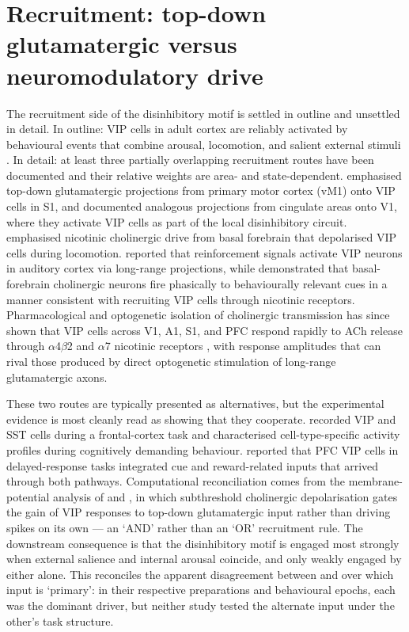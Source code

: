 \documentclass[11pt]{article}
\begin{document}
\section{Recruitment: top-down glutamatergic versus neuromodulatory drive}

The recruitment side of the disinhibitory motif is settled in outline and unsettled in detail. In outline: VIP cells in adult cortex are reliably activated by behavioural events that combine arousal, locomotion, and salient external stimuli \citep{Fu2014, Pinto2015, Pakan2016, Dipoppa2018, Garrett2020}. In detail: at least three partially overlapping recruitment routes have been documented and their relative weights are area- and state-dependent. \citet{Lee2013} emphasised top-down glutamatergic projections from primary motor cortex (vM1) onto VIP cells in S1, and \citet{Zhang2014} documented analogous projections from cingulate areas onto V1, where they activate VIP cells as part of the local disinhibitory circuit. \citet{Fu2014} emphasised nicotinic cholinergic drive from basal forebrain that depolarised VIP cells during locomotion. \citet{Pi2013} reported that reinforcement signals activate VIP neurons in auditory cortex via long-range projections, while \citet{Hangya2015} demonstrated that basal-forebrain cholinergic neurons fire phasically to behaviourally relevant cues in a manner consistent with recruiting VIP cells through nicotinic receptors. Pharmacological and optogenetic isolation of cholinergic transmission has since shown that VIP cells across V1, A1, S1, and PFC respond rapidly to ACh release through $\alpha$4$\beta$2 and $\alpha$7 nicotinic receptors \citep{Pinto2015, Kuchibhotla2017, Williams2019, Anastasiades2021a, Mcfarlan2024a}, with response amplitudes that can rival those produced by direct optogenetic stimulation of long-range glutamatergic axons.

These two routes are typically presented as alternatives, but the experimental evidence is most cleanly read as showing that they cooperate. \citet{Pinto2015} recorded VIP and SST cells during a frontal-cortex task and characterised cell-type-specific activity profiles during cognitively demanding behaviour. \citet{Kamigaki2017} reported that PFC VIP cells in delayed-response tasks integrated cue and reward-related inputs that arrived through both pathways. Computational reconciliation comes from the membrane-potential analysis of \citet{Garciadelmolino2017} and \citet{Hertag2019}, in which subthreshold cholinergic depolarisation gates the gain of VIP responses to top-down glutamatergic input rather than driving spikes on its own --- an `AND' rather than an `OR' recruitment rule. The downstream consequence is that the disinhibitory motif is engaged most strongly when external salience and internal arousal coincide, and only weakly engaged by either alone. This reconciles the apparent disagreement between \citet{Pi2013} and \citet{Fu2014} over which input is `primary': in their respective preparations and behavioural epochs, each was the dominant driver, but neither study tested the alternate input under the other's task structure.
\end{document}
